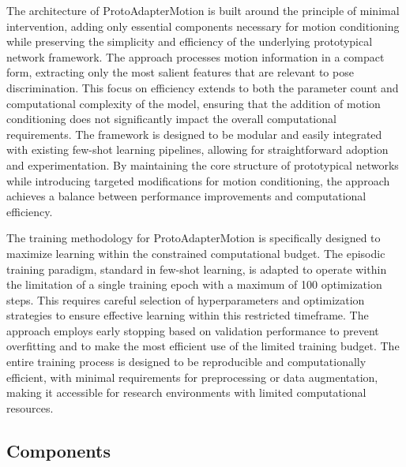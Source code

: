 \documentclass[11pt]{article}
\begin{document}
The architecture of ProtoAdapterMotion is built around the principle of minimal intervention, adding only essential components necessary for motion conditioning while preserving the simplicity and efficiency of the underlying prototypical network framework. The approach processes motion information in a compact form, extracting only the most salient features that are relevant to pose discrimination. This focus on efficiency extends to both the parameter count and computational complexity of the model, ensuring that the addition of motion conditioning does not significantly impact the overall computational requirements. The framework is designed to be modular and easily integrated with existing few-shot learning pipelines, allowing for straightforward adoption and experimentation. By maintaining the core structure of prototypical networks while introducing targeted modifications for motion conditioning, the approach achieves a balance between performance improvements and computational efficiency.

The training methodology for ProtoAdapterMotion is specifically designed to maximize learning within the constrained computational budget. The episodic training paradigm, standard in few-shot learning, is adapted to operate within the limitation of a single training epoch with a maximum of 100 optimization steps. This requires careful selection of hyperparameters and optimization strategies to ensure effective learning within this restricted timeframe. The approach employs early stopping based on validation performance to prevent overfitting and to make the most efficient use of the limited training budget. The entire training process is designed to be reproducible and computationally efficient, with minimal requirements for preprocessing or data augmentation, making it accessible for research environments with limited computational resources.

\subsection{Components}
\end{document}
